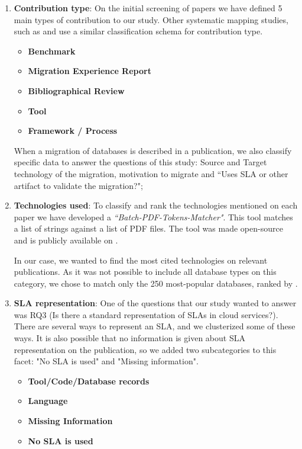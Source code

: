 \documentclass{article}
\newcommand{\martin}[1]{\marginpar{\textcolor{magenta}{\textbf{Martin: }#1}}}
\begin{document}
\begin{enumerate}
    \item \textbf{Contribution type}: On the initial screening of papers we have defined 5 main types of contribution to our study. Other systematic mapping studies, such as \cite{6405289} and \cite{Ameller201542} use a similar classification schema for contribution type.
    \begin{itemize}
      \item \textbf{Benchmark}
      \item \textbf{Migration Experience Report}
      \item \textbf{Bibliographical Review}
      \item \textbf{Tool}
      \item \textbf{Framework / Process}
    \end{itemize}

    When a migration of databases is described in a publication, we also classify specific data to answer the questions of this study:  Source and Target technology of the migration, motivation to migrate and ``Uses SLA or other artifact to validate the migration?"; 

    \item \textbf{Technologies used}: To classify and rank the technologies mentioned on each paper we have developed a \textit{``Batch-PDF-Tokens-Matcher"}. This tool matches a list of strings against a list of PDF files. The tool was made open-source and is publicly available on \cite{pythonBatchPDFTokenMatcher}.
    \martin{faltou o link.}

    In our case, we wanted to find the most cited technologies on relevant publications. As it was not possible to include all database types on this category, we chose to match only the 250 most-popular databases, ranked by \cite{dbranking}.

    \item \textbf{SLA representation}: One of the questions that our study wanted to answer was RQ3 (Is there a standard representation of SLAs in cloud services?). There are several ways to represent an SLA, and we clusterized some of these ways. It is also possible that no information is given about SLA representation on the publication, so we added two subcategories to this facet: "No SLA is used" and "Missing information".  
    \begin{itemize}
      \item \textbf{Tool/Code/Database records}
      \item \textbf{Language}
      \item \textbf{Missing Information}
      \item \textbf{No SLA is used}
    \end{itemize}  
\end{enumerate}
\end{document}

